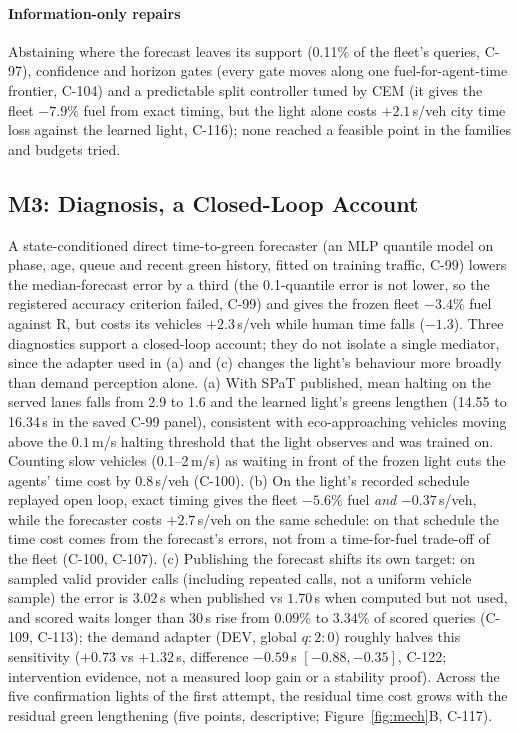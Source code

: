 \paragraph{Information-only repairs} Abstaining where the forecast leaves its support (0.11\% of the fleet's queries, C-97), confidence and
horizon gates (every gate moves along one fuel-for-agent-time frontier, C-104) and a predictable split controller tuned by CEM (it gives the
fleet $-7.9\%$ fuel from exact timing, but the light alone costs $+2.1$\,s/veh city time loss against the learned light, C-116); none
reached a feasible point in the families and budgets tried.

\subsection{M3: Diagnosis, a Closed-Loop Account}\label{sec:diag}
A state-conditioned direct time-to-green forecaster (an MLP quantile model on phase, age, queue and recent green history, fitted on training
traffic, C-99) lowers the median-forecast error by a third (the 0.1-quantile error is not lower, so the
registered accuracy criterion failed, C-99) and gives the frozen fleet $-3.4\%$ fuel against R, but costs its vehicles
$+2.3$\,s/veh while human time falls ($-1.3$). Three diagnostics support a closed-loop account; they do not isolate a single mediator,
since the adapter used in (a) and (c) changes the light's behaviour more broadly than demand perception alone.
(a) With SPaT published, mean halting on the served lanes falls from 2.9 to 1.6 and the learned light's greens lengthen (14.55 to 16.34\,s in the saved C-99 panel),
consistent with eco-approaching vehicles moving above the $0.1$\,m/s halting threshold that the light observes and was trained on. Counting slow vehicles
(0.1--2\,m/s) as waiting in front of the frozen light cuts the agents' time cost by $0.8$\,s/veh (C-100).
(b) On the light's recorded schedule replayed open loop, exact timing gives the fleet $-5.6\%$ fuel \emph{and} $-0.37$\,s/veh, while the forecaster
costs $+2.7$\,s/veh on the same schedule: on that schedule the time cost comes from the forecast's errors, not from a time-for-fuel
trade-off of the fleet (C-100, C-107).
(c) Publishing the forecast shifts its own target: on sampled valid provider calls (including repeated calls, not a uniform vehicle sample) the error is $3.02$\,s when published vs $1.70$\,s when computed
but not used, and scored waits longer than 30\,s rise from $0.09\%$ to $3.34\%$ of scored queries (C-109, C-113); the demand adapter (DEV, global $q{:}2{:}0$) roughly halves this
sensitivity ($+0.73$ vs $+1.32$\,s, difference $-0.59$\,s $[-0.88,-0.35]$, C-122; intervention evidence, not a measured loop gain or a stability proof). Across the five confirmation lights of the first attempt, the residual time cost grows with the residual green
lengthening (five points, descriptive; Figure~\ref{fig:mech}B, C-117).

